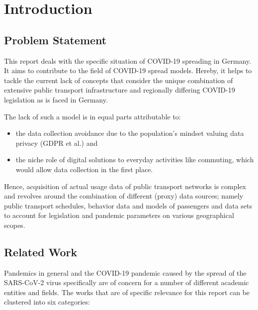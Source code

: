 \section{Introduction}

\subsection{Problem Statement}
This report deals with the specific situation of COVID-19 spreading in Germany. It aims to contribute to the field of COVID-19 spread models. Hereby, it helps to tackle the current lack of concepts that consider the unique combination of extensive public transport infrastructure and regionally differing COVID-19 legislation as is faced in Germany.

The lack of such a model is in equal parts attributable to:
\begin{itemize}
	\item the data collection avoidance due to the population's mindset valuing data privacy (GDPR et al.) and
	\item the niche role of digital solutions to everyday activities like commuting, which would allow data collection in the first place.
\end{itemize}

Hence, acquisition of actual usage data of public transport networks is complex and revolves around the combination of different (proxy) data sources; namely public transport schedules, behavior data and models of passengers and data sets to account for legislation and pandemic parameters on various geographical scopes.

\subsection{Related Work}
Pandemics in general and the COVID-19 pandemic caused by the spread of the SARS-CoV-2 virus specifically are of concern for a number of different academic entities and fields. The works that are of specific relevance for this report can be clustered into six categories:

